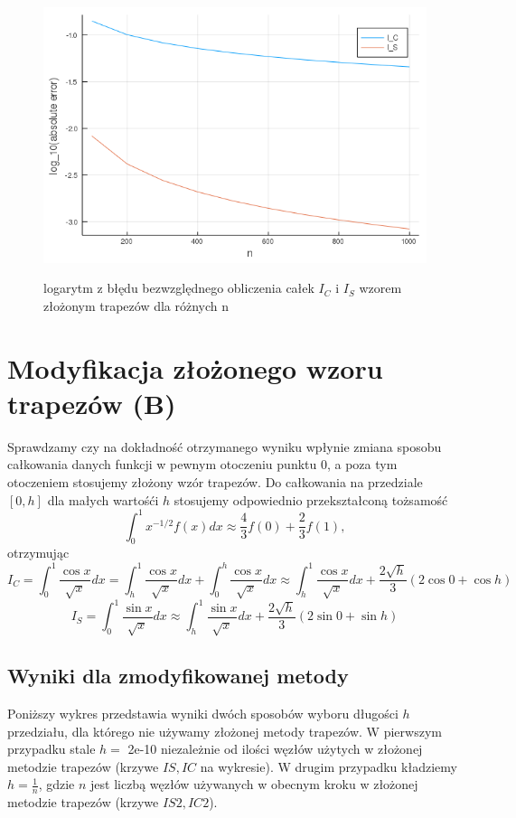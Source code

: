 \documentclass{article}
\begin{document}
\begin{figure}[ht]
    \includegraphics[scale=0.5]{WykresAlogabsolute.png}
    \label{wykresA}
    \caption{logarytm z błędu bezwzględnego obliczenia całek $I_C$ i $I_S$ wzorem złożonym trapezów dla różnych n}
\end{figure}
\section*{Modyfikacja złożonego wzoru trapezów (B)}
Sprawdzamy czy na dokładność otrzymanego wyniku wpłynie zmiana sposobu całkowania danych funkcji w pewnym otoczeniu punktu 0, a poza tym otoczeniem stosujemy złożony wzór trapezów. Do całkowania na przedziale $[0,h]$ dla małych wartośći $h$ stosujemy odpowiednio przekształconą tożsamość \[
	\int_0^1 x^{-1/2}f(x) dx \approx \frac{4}{3}f(0)+\frac{2}{3}f(1), \]
otrzymując \[
	I_C = \int_0^1 \frac{\cos{x}}{\sqrt{x}} dx = \int_h^1 \frac{\cos{x}}{\sqrt{x}}dx + \int_0^h \frac{\cos{x}}{\sqrt{x}} dx \approx \int_h^1 \frac{\cos{x}}{\sqrt{x}}dx + \frac{2\sqrt{h}}{3}(2\cos{0}+\cos{h}) \]
\[
	I_S = \int_0^1 \frac{\sin{x}}{\sqrt{x}} dx \approx \int_h^1 \frac{\sin{x}}{\sqrt{x}}dx + \frac{2\sqrt{h}}{3}(2\sin{0}+\sin{h}) \]
\subsection*{Wyniki dla zmodyfikowanej metody}
Poniższy wykres przedstawia wyniki dwóch sposobów wyboru długości $h$ przedziału, dla którego nie używamy złożonej metody trapezów. W pierwszym przypadku stale $h=$ 2e-10 niezależnie od ilości węzłów użytych w złożonej metodzie trapezów (krzywe $IS,IC$ na wykresie). W drugim przypadku kładziemy $h=\frac{1}{n}$, gdzie $n$ jest liczbą węzłów używanych w obecnym kroku w złożonej metodzie trapezów (krzywe $IS2,IC2$).
\end{document}
